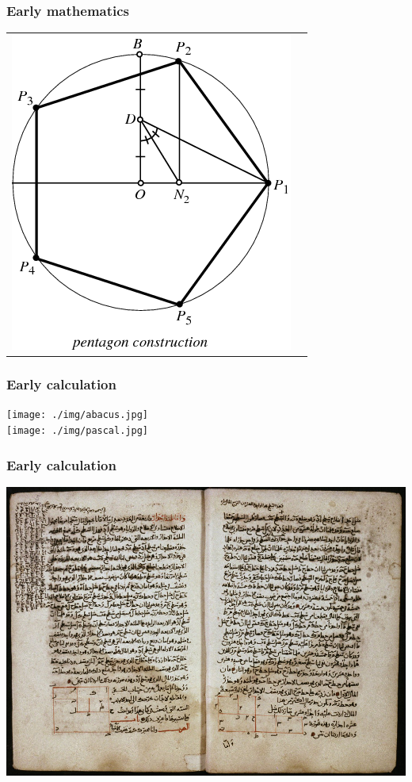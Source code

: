 \documentclass[11pt]{beamer}
\begin{document}
\begin{frame}[fragile]
  \frametitle{Early mathematics}

  \begin{tabular}{cc}
  \includegraphics[height=0.75\textheight]{./img/pentagon.png}
  \end{tabular}
\end{frame}

\begin{frame}[fragile]
  \frametitle{Early calculation}

  \texttt{[image: ./img/abacus.jpg]} \\
  \texttt{[image: ./img/pascal.jpg]}
\end{frame}

\begin{frame}[fragile]
  \frametitle{Early calculation}

  \includegraphics[height=0.75\textheight]{./img/al-khwarizmi.png}
\end{frame}
\end{document}
